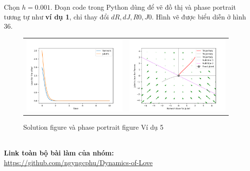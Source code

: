 Chọn $h=0.001$. Đoạn code trong Python dùng để vẽ đồ thị và phase portrait tương tự như \textbf{ví dụ 1}, chỉ thay đổi $dR, dJ, R0, J0$. Hình vẽ được biểu diễn ở hình 36.
\begin{figure}[h!]
    \begin{center}
        \begin{tabular}{cc}
             \includegraphics[width=7cm]{images/euler_5.png} &
             \includegraphics[width=7cm]{images/euler_5_portrait.png}\\
        \end{tabular}
        \caption{Solution figure và phase portrait figure Ví dụ 5}
    \end{center}
\end{figure}\\
\textbf{Link toàn bộ bài làm của nhóm:}\\
\url{https://github.com/ngyngcphu/Dynamics-of-Love}